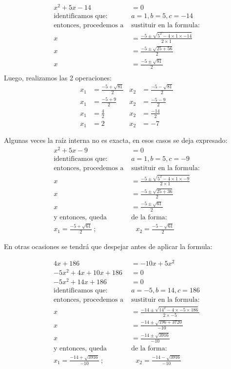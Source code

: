 \documentclass[12pt]{article}
\begin{document}
    \begin{align*}
        x^2 + 5x -14 &= 0		\\
        \text{identificamos que: }& a=1,b=5,c=-14\\
        \text{entonces, procedemos a }&\text{sustituir en la formula:}\\
        x &= \frac{-5\pm \sqrt{5^2-4\times1\times-14}}{2\times1}\\
        x &= \frac{-5\pm \sqrt{25+56}}{2}\\
        x &= \frac{-5\pm \sqrt{81}}{2}\\
    \end{align*}
        Luego, realizamos las 2 operaciones:
     \begin{align*}
         x_1 &= \frac{-5 +\sqrt{81}}{2} &  x_2 &= \frac{-5 -\sqrt{81}}{2}\\
         x_1 &= \frac{-5 +9}{2} & x_2 &= \frac{-5 -9}{2}\\
         x_1 &= \frac{4}{2} &  x_2 &= \frac{-14}{2}\\
         x_1 &= 2 &  x_2 &= -7
    \end{align*}

    Algunas veces la raíz interna no es exacta, en esos casos se deja expresado:
    \begin{align*}
        x^2 + 5x -9 &= 0		\\
        \text{identificamos que: }& a=1,b=5,c=-9\\
        \text{entonces, procedemos a }&\text{sustituir en la formula:}\\
        x &= \frac{-5\pm \sqrt{5^2-4\times1\times-9}}{2\times1}\\
        x &= \frac{-5\pm \sqrt{25+36}}{2}\\
        x &= \frac{-5\pm \sqrt{61}}{2}\\
        \text{y entonces, queda }&\text{de la forma:}\\
        x_1 = \frac{-5 +\sqrt{61}}{2}\ ;&\ \ \  x_2 = \frac{-5 -\sqrt{61}}{2}
    \end{align*}

    En otras ocasiones se tendrá que despejar antes de aplicar la formula:

    \begin{align*}
        4x +186 &= -10x + 5x^2 \\
        -5x^2 +4x+10x+186 &= 0\\
        -5x^2 +14x+186 &= 0\\
        \text{identificamos que: }& a=-5,b=14,c=186\\
        \text{entonces, procedemos a }&\text{sustituir en la formula:}\\
        x &= \frac{-14\pm \sqrt{14^2-4\times-5\times186}}{2\times-5}\\
        x &= \frac{-14 \pm \sqrt{196+3720}}{-10}\\
        x &= \frac{-14 \pm \sqrt{3916}}{-10} \\
        \text{y entonces, queda }&\text{de la forma:}\\
        x_1 = \frac{-14+\sqrt{3916}}{-10}\ ;&\ \ \  x_2 = \frac{-14 -\sqrt{3916}}{-10}
    \end{align*}
\end{document}
